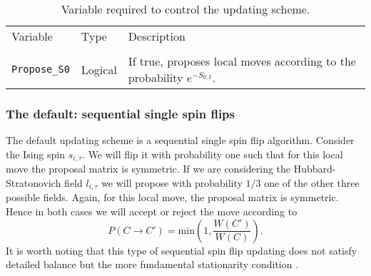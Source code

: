 \documentclass{SciPost}
\begin{document}
\begin{table}[h]
   \begin{tabular}{@{} l l l @{}}\toprule
        Variable  &  Type                  &  Description   \\
         \\\midrule
       \texttt{Propose\_S0}   &    Logical       &  If true, proposes local moves according to the probability $e^{-S_{0,I}}$. 
         \\\bottomrule
   \end{tabular}
   \caption{Variable required to control the updating scheme. \label{table:Updating_schemes}}
\end{table}
% 
\subsubsection{The default: sequential  single spin flips}
%
The default updating scheme is a  sequential single  spin flip algorithm.   Consider   the Ising spin $s_{i,\tau}$. We will flip it with probability one such that for  this local move  the  proposal matrix is symmetric.  If we are considering the Hubbard-Stratonovich field $l_{i,\tau}$  we will propose with probability $1/3$ one  of the other three  possible fields.   Again, for this local move, the proposal matrix is symmetric.  Hence in both cases we will accept or reject the move according to 
 \begin{equation}
 	P(C \rightarrow C') =  \text{min}  \left( 1, \frac{ W(C')}{W(C)} \right).
 \end{equation}
 It is worth noting that this type of sequential spin flip updating does not satisfy detailed balance but the more fundamental stationarity condition \cite{Sokal89}. 
% 
\end{document}
